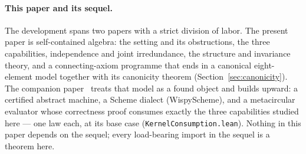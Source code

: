 \documentclass[sigconf,screen]{acmart}
\theoremstyle{remark}
\begin{document}
\paragraph{This paper and its sequel.} The development spans two
papers with a strict division of labor. The present paper is
self-contained algebra: the setting and its obstructions, the three
capabilities, independence and joint irredundance, the structure and
invariance theory, and a connecting-axiom programme that ends in a
canonical eight-element model together with its canonicity theorem
(Section~\ref{sec:canonicity}). The companion
paper~\cite{companion-pearl} treats that model as a found object and
builds upward: a certified abstract machine, a Scheme dialect
(WispyScheme), and a metacircular evaluator whose correctness proof
consumes exactly the three capabilities studied here --- one law
each, at its base case (\texttt{KernelConsumption.lean}). Nothing in
this paper depends on the sequel; every load-bearing import in the
sequel is a theorem here.
\end{document}
